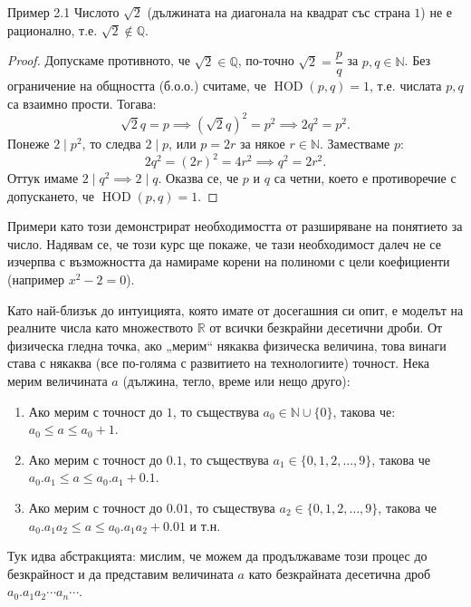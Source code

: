 \begin{problembox}{Пример 2.1}
Числото $\sqrt{2}$ (дължината на диагонала на квадрат със страна $1$) не е рационално, т.е. $\sqrt{2} \notin \mathbb{Q}$.
\end{problembox}

\begin{proof}
Допускаме противното, че $\sqrt{2} \in \mathbb{Q}$, по-точно $\sqrt{2} = \dfrac{p}{q}$ за $p, q \in \mathbb{N}$. Без ограничение на общността (б.о.о.) считаме, че $\operatorname{HOD}(p, q) = 1$, т.е. числата $p, q$ са взаимно прости. Тогава:
\[
\sqrt{2}q = p \implies (\sqrt{2}q)^2 = p^2 \implies 2q^2 = p^2.
\]
Понеже $2 \mid p^2$, то следва $2 \mid p$, или $p = 2r$ за някое $r \in \mathbb{N}$. Заместваме $p$:
\[
2q^2 = (2r)^2 = 4r^2 \implies q^2 = 2r^2.
\]
Оттук имаме $2 \mid q^2 \implies 2 \mid q$. Оказва се, че $p$ и $q$ са четни, което е противоречие с допускането, че $\operatorname{HOD}(p, q) = 1$.
\end{proof}

Примери като този демонстрират необходимостта от разширяване на понятието за число. Надявам се, че този курс ще покаже, че тази необходимост далеч не се изчерпва с възможността да намираме корени на полиноми с цели коефициенти (например $x^2 - 2 = 0$).

Като най-близък до интуицията, която имате от досегашния си опит, е моделът на реалните числа като множеството $\mathbb{R}$ от всички безкрайни десетични дроби. От физическа гледна точка, ако „мерим“ някаква физическа величина, това винаги става с някаква (все по-голяма с развитието на технологиите) точност. Нека мерим величината $a$ (дължина, тегло, време или нещо друго):
\begin{enumerate}
    \item Ако мерим с точност до $1$, то съществува $a_0 \in \mathbb{N} \cup \{0\}$, такова че: $a_0 \le a \le a_0 + 1$.
    \item Ако мерим с точност до $0.1$, то съществува $a_1 \in \{0, 1, 2, \dots, 9\}$, такова че $a_0.a_1 \le a \le a_0.a_1 + 0.1$.
    \item Ако мерим с точност до $0.01$, то съществува $a_2 \in \{0, 1, 2, \dots, 9\}$, такова че $a_0.a_1a_2 \le a \le a_0.a_1a_2 + 0.01$ и т.н.
\end{enumerate}

Тук идва абстракцията: мислим, че можем да продължаваме този процес до безкрайност и да представим величината $a$ като безкрайната десетична дроб $a_0.a_1a_2 \cdots a_n \cdots$.

